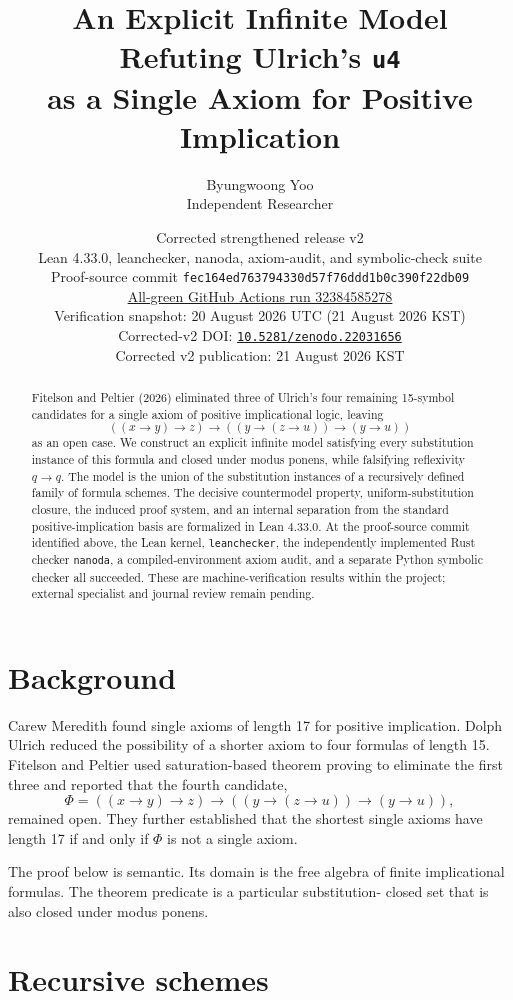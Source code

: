 \documentclass[11pt]{article}
\title{An Explicit Infinite Model Refuting Ulrich's \texttt{u4}\\
as a Single Axiom for Positive Implication}
\author{Byungwoong Yoo\\Independent Researcher}
\date{Corrected strengthened release v2\\
Lean 4.33.0, leanchecker, nanoda, axiom-audit, and symbolic-check suite\\
Proof-source commit \texttt{fec164ed763794330d57f76ddd1b0c390f22db09}\\
\href{https://github.com/ByungwoongYoo/ntg-optn-tbk1-tkm-triage/actions/runs/32384585278}
{All-green GitHub Actions run 32384585278}\\
Verification snapshot: 20 August 2026 UTC (21 August 2026 KST)\\
Corrected-v2 DOI: \href{https://doi.org/10.5281/zenodo.22031656}
{\texttt{10.5281/zenodo.22031656}}\\
Corrected v2 publication: 21 August 2026 KST}
\newcommand{\Imp}{\mathbin{\to}}
\begin{document}
\maketitle

\begin{abstract}
Fitelson and Peltier (2026) eliminated three of Ulrich's four remaining
15-symbol candidates for a single axiom of positive implicational logic,
leaving
\[
((x\Imp y)\Imp z)\Imp((y\Imp(z\Imp u))\Imp(y\Imp u))
\]
as an open case.  We construct an explicit infinite model satisfying every
substitution instance of this formula and closed under modus ponens, while
falsifying reflexivity $q\Imp q$.  The model is the union of the substitution
instances of a recursively defined family of formula schemes.  The decisive
countermodel property, uniform-substitution closure, the induced proof system,
and an internal separation from the standard positive-implication basis are
formalized in Lean 4.33.0.  At the proof-source commit identified above, the
Lean kernel, \texttt{leanchecker}, the independently implemented Rust checker
\texttt{nanoda}, a compiled-environment axiom audit, and a separate Python
symbolic checker all succeeded.  These are machine-verification results within
the project; external specialist and journal review remain pending.
\end{abstract}

\section{Background}

Carew Meredith found single axioms of length 17 for positive implication.
Dolph Ulrich reduced the possibility of a shorter axiom to four formulas of
length 15.  Fitelson and Peltier used saturation-based theorem proving to
eliminate the first three and reported that the fourth candidate,
\begin{equation}\label{eq:u4}
\Phi=((x\Imp y)\Imp z)\Imp((y\Imp(z\Imp u))\Imp(y\Imp u)),
\end{equation}
remained open.  They further established that the shortest single axioms
have length 17 if and only if $\Phi$ is not a single axiom.

The proof below is semantic.  Its domain is the free algebra of finite
implicational formulas.  The theorem predicate is a particular substitution-
closed set that is also closed under modus ponens.

\section{Recursive schemes}
\end{document}
